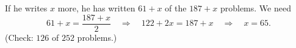 If he writes $x$ more, he has written $61+x$ of the $187+x$ problems. We need
\[
61+x=\dfrac{187+x}{2}\quad\Longrightarrow\quad122+2x=187+x\quad\Longrightarrow\quad x=\boxed{65}.
\]
(Check: $126$ of $252$ problems.)
